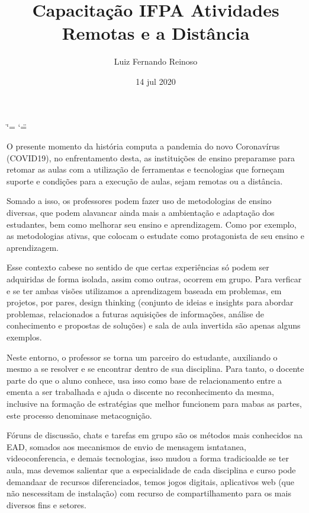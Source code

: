 \documentclass[letterpaper,10pt,brazil]{sphinxmanual}
\title{Capacitação IFPA \sphinxhyphen{} Atividades Remotas e a Distância}
\date{14 jul 2020}
\author{Luiz Fernando Reinoso}
\begin{document}
\ifdefined\shorthandoff
  \ifnum\catcode`\=\string=\active\shorthandoff{=}\fi
  \ifnum\catcode`\"=\active{}\fi
\fi

\pagestyle{empty}
\sphinxmaketitle
\pagestyle{plain}
\sphinxtableofcontents
\pagestyle{normal}
\label{\detokenize{index::doc}}


O presente momento da história computa a pandemia do novo Coronavírus (COVID\sphinxhyphen{}19), no enfrentamento desta, as instituições de ensino preparam\sphinxhyphen{}se para retomar as aulas com a utilização de ferramentas e tecnologias que forneçam suporte e condições para a execução de aulas, sejam remotas ou a distância.

Somado a isso, os professores podem fazer uso de metodologias de ensino diversas, que podem alavancar ainda mais a ambientação e adaptação dos estudantes, bem como melhorar seu ensino e aprendizagem. Como por exemplo, as metodologias ativas, que colocam o estudate como protagonista de seu ensino e aprendizagem.

Esse contexto cabe\sphinxhyphen{}se no sentido de que certas experiências só podem ser adquiridas de forma isolada,  assim como outras, ocorrem em grupo. Para verficar e se ter ambas visões utilizamos a aprendizagem baseada em problemas, em projetos, por pares, design thinking (conjunto de ideias e insights para abordar problemas, relacionados a futuras aquisições de informações, análise de conhecimento e propostas de soluções) e sala de aula invertida são apenas alguns exemplos.

Neste entorno, o professor se torna um parceiro do estudante, auxiliando o mesmo a se resolver e se encontrar dentro de sua disciplina. Para tanto, o docente parte do que o aluno conhece, usa isso como base de relacionamento entre a ementa a ser trabalhada e ajuda o discente no reconhecimento da mesma, inclusive na formação de estratégias que melhor funcionem para mabas as partes, este processo denomina\sphinxhyphen{}se metacognição.

Fóruns de discussão, chats e tarefas em grupo são os métodos mais conhecidos na EAD, somados aos mecanismos de envio de mensagem isntatanea, videoconferencia, e demais tecnologias, isso mudou a forma tradicioalde se ter aula, mas devemos salientar que a especialidade de cada disciplina e curso pode demandaar de recursos diferenciados, temos jogos digitais, aplicativos web (que não nescessitam de instalação) com recurso de compartilhamento para os mais diversos fins e setores.
\end{document}
